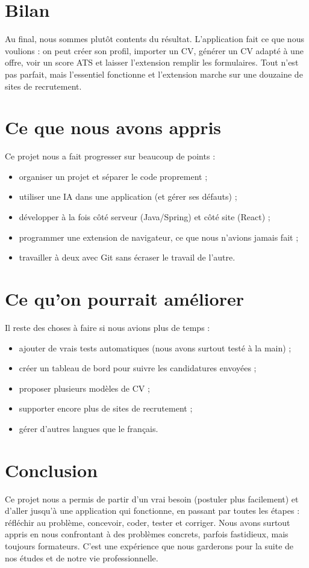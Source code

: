\documentclass[12pt,a4paper]{report}
\begin{document}
\section{Bilan}
Au final, nous sommes plut\^ot contents du r\'esultat. L'application fait ce que
nous voulions : on peut cr\'eer son profil, importer un CV, g\'en\'erer un CV adapt\'e \`a
une offre, voir un score ATS et laisser l'extension remplir les formulaires. Tout
n'est pas parfait, mais l'essentiel fonctionne et l'extension marche sur une
douzaine de sites de recrutement.

\section{Ce que nous avons appris}
Ce projet nous a fait progresser sur beaucoup de points :
\begin{itemize}[leftmargin=1.4em, itemsep=2pt]
  \item organiser un projet et s\'eparer le code proprement ;
  \item utiliser une IA dans une application (et g\'erer ses d\'efauts) ;
  \item d\'evelopper \`a la fois c\^ot\'e serveur (Java/Spring) et c\^ot\'e site
  (React) ;
  \item programmer une extension de navigateur, ce que nous n'avions jamais
  fait ;
  \item travailler \`a deux avec Git sans \'ecraser le travail de l'autre.
\end{itemize}

\section{Ce qu'on pourrait am\'eliorer}
Il reste des choses \`a faire si nous avions plus de temps :
\begin{itemize}[leftmargin=1.4em, itemsep=2pt]
  \item ajouter de vrais tests automatiques (nous avons surtout test\'e \`a la
  main) ;
  \item cr\'eer un tableau de bord pour suivre les candidatures envoy\'ees ;
  \item proposer plusieurs mod\`eles de CV ;
  \item supporter encore plus de sites de recrutement ;
  \item g\'erer d'autres langues que le fran\c{c}ais.
\end{itemize}

\section{Conclusion}
Ce projet nous a permis de partir d'un vrai besoin (postuler plus facilement) et
d'aller jusqu'\`a une application qui fonctionne, en passant par toutes les \'etapes :
r\'efl\'echir au probl\`eme, concevoir, coder, tester et corriger. Nous avons surtout
appris en nous confrontant \`a des probl\`emes concrets, parfois fastidieux, mais
toujours formateurs. C'est une exp\'erience que nous garderons pour la suite de nos
\'etudes et de notre vie professionnelle.
\end{document}
